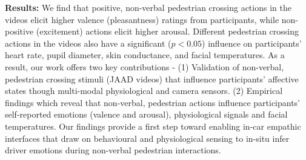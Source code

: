 \documentclass[acmlarge]{acmart}
\begin{document}
\noindent \textbf{Results:} 
We find that positive, non-verbal pedestrian crossing actions in the videos elicit higher valence (pleasantness) ratings from participants, while non-positive (excitement) actions elicit higher arousal. Different pedestrian crossing actions in the videos also have a significant ($p<0.05$) influence on participants' heart rate, pupil diameter, skin conductance, and facial temperatures. As a result, our work offers two key contributions - (1) Validation of non-verbal, pedestrian crossing stimuli (JAAD videos) that influence participants' affective states though multi-modal physiological and camera sensors. (2) Empirical findings which reveal that non-verbal, pedestrian actions influence participants' self-reported emotions (valence and arousal), physiological signals and facial temperatures. Our findings provide a first step toward enabling in-car empathic interfaces that draw on behavioural and physiological sensing to in-situ infer driver emotions during non-verbal pedestrian interactions.
\end{document}
